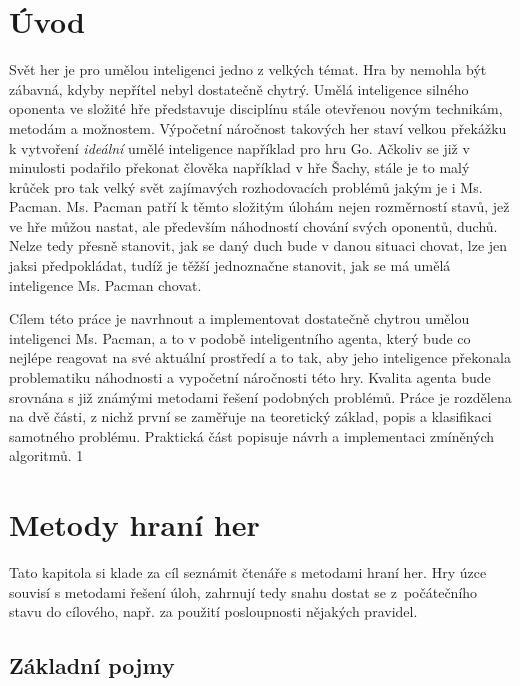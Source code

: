 \chapter{Úvod}
    Svět her je pro umělou inteligenci jedno z velkých témat. Hra by nemohla být zábavná, kdyby nepřítel nebyl dostatečně chytrý. Umělá inteligence silného oponenta ve složité hře představuje disciplínu stále otevřenou novým technikám, metodám a možnostem. Výpočetní náročnost takových her staví velkou překážku k vytvoření \textit{ideální} umělé inteligence například pro hru Go. Ačkoliv se již v minulosti podařilo překonat člověka například v hře Šachy, stále je to malý krůček pro tak velký svět zajímavých rozhodovacích problémů jakým je i Ms. Pacman. Ms. Pacman patří k těmto složitým úlohám nejen rozměrností stavů, jež ve hře můžou nastat, ale především náhodností chování svých oponentů, duchů. Nelze tedy přesně stanovit, jak se daný duch bude v danou situaci chovat, lze jen jaksi předpokládat, tudíž je těžší jednoznačne stanovit, jak se má umělá inteligence Ms. Pacman chovat.

Cílem této práce je navrhnout a implementovat dostatečně chytrou umělou inteligenci Ms. Pacman, a to v podobě inteligentního agenta, který bude co nejlépe reagovat na své aktuální prostředí a to tak, aby jeho inteligence překonala problematiku náhodnosti a vypočetní náročnosti této hry. Kvalita agenta bude srovnána s již známými metodami řešení podobných problémů. Práce je rozdělena na dvě části, z nichž první se zaměřuje na teoretický základ, popis a klasifikaci samotného problému. Praktická část popisuje návrh a implementaci zmíněných algoritmů.
1
\chapter{Metody hraní her}
Tato kapitola si klade za cíl seznámit čtenáře s metodami hraní her. Hry úzce souvisí s metodami řešení úloh, zahrnují tedy snahu dostat se z počátečního stavu do cílového, např. za použití posloupnosti nějakých pravidel. 

\section{Základní pojmy}

